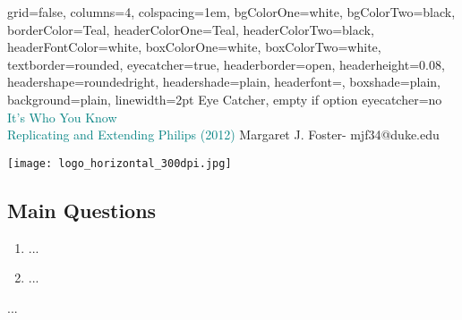 \documentclass[landscape,paperheight=24in,fontscale=.45,paperwidth=36in,landscape,final]{baposter}
\begin{document}
\background{}

\begin{poster}{
  grid=false,
  columns=4,
  colspacing=1em,
  bgColorOne=white, %
  bgColorTwo=black, %
  borderColor=Teal,  %
  headerColorOne=Teal,  %
  headerColorTwo=black,  %
  headerFontColor=white, %
  boxColorOne=white,
  boxColorTwo=white,
  textborder=rounded,
  eyecatcher=true,
  headerborder=open,
  headerheight=0.08\textheight,
  headershape=roundedright,
  headershade=plain,
  headerfont=\large\textsc, %
  boxshade=plain,
  background=plain,
  linewidth=2pt
  }
{
Eye Catcher, empty if option eyecatcher=no
}
{
\textcolor{Teal}{It's Who You Know}\\ \LARGE
\textcolor{Teal}{Replicating and Extending Philips (2012)}
}
{
\textcolor{LBlue}{Margaret J. Foster- mjf34@duke.edu}
}
  {{\begin{minipage}{13em}
    \hfill
    \texttt{[image: logo\_horizontal\_300dpi.jpg]}
  \end{minipage}}
  }


{
\subsection*{Main Questions}
\begin{enumerate}
\item ...
\item ...
\end{enumerate}
\vspace{-2mm}
...
\vspace{-2mm}
}
\end{poster}
\end{document}
